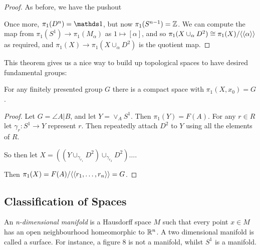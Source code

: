 \documentclass[10pt,a4paper]{article}
\begin{document}
\begin{proof}
As before, we have the pushout
\begin{center}
\end{center}
Once more, $\pi_1(D^n) = \one$, but now $\pi_1(S^{n-1}) = \mathbb{Z}$. We can compute the map from $\pi_1(S^1) \to \pi_1(M_{\alpha})$ as $1 \mapsto [\alpha]$, and so $\pi_1(X\cup_{\alpha} D^2) \cong \pi_1(X)/\langle \langle \alpha \rangle \rangle$ as required, and $\pi_1(X) \to \pi_1(X\cup_{\alpha} D^2)$ is the quotient map.
\end{proof}
This theorem gives us a nice way to build up topological spaces to have desired fundamental groups:
\begin{theorem}
For any finitely presented group $G$ there is a compact space with $\pi_1(X, x_0) = G$.
\end{theorem}
\begin{proof}
Let $G = \angle{A|B}$, and let $Y = \vee_A S^1$. Then $\pi_1(Y) = F(A)$. For any $r \in R$ let $\gamma_r : S^1 \to Y$ represent $r$. Then repeatedly attach $D^2$ to $Y$ using all the elements of $R$. 

So then let $X = ((Y \cup_{\gamma_{r_1}} D^2) \cup_{\gamma_{r_2}} D^2 ) \ldots$.

Then $\pi_1(X) = F(A)/\langle \langle r_1, \ldots, r_n \rangle \rangle = G$.
\end{proof}

\subsection*{Classification of Spaces}
An \emph{n-dimensional manifold} is a Hausdorff space $M$ such that every point $x \in M$ has an open neighbourhood homeomorphic to $\mathbb{R}^n$. A two dimensional manifold is called a surface. For instance, a figure 8 is not a manifold, whilst $S^1$ is a manifold.
\end{document}
